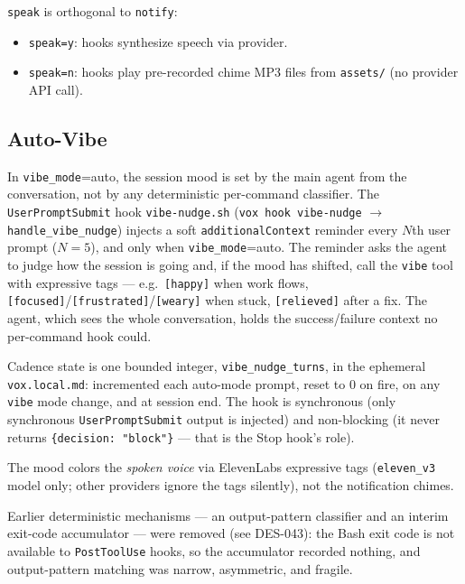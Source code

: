 \documentclass[a4paper,10pt]{article}
\newcommand{\tool}[1]{\texttt{#1}}
\newcommand{\field}[1]{\texttt{#1}}
\newcommand{\hook}[1]{\texttt{#1}}
\begin{document}
\field{speak} is orthogonal to \field{notify}:

\begin{itemize}
  \item \field{speak=y}: hooks synthesize speech via provider.
  \item \field{speak=n}: hooks play pre-recorded chime MP3 files
    from \texttt{assets/} (no provider API call).
\end{itemize}

\subsection{Auto-Vibe}

In \field{vibe\_mode}=auto, the session mood is set by the main
agent from the conversation, not by any deterministic per-command
classifier.  The \hook{UserPromptSubmit} hook \texttt{vibe-nudge.sh}
(\texttt{vox hook vibe-nudge} $\to$ \texttt{handle\_vibe\_nudge})
injects a soft \texttt{additionalContext} reminder every $N$th user
prompt ($N=5$), and only when \field{vibe\_mode}=auto.  The reminder
asks the agent to judge how the session is going and, if the mood has
shifted, call the \tool{vibe} tool with expressive tags --- e.g.\
\texttt{[happy]} when work flows,
\texttt{[focused]}/\texttt{[frustrated]}/\texttt{[weary]} when stuck,
\texttt{[relieved]} after a fix.  The agent, which sees the whole
conversation, holds the success/failure context no per-command hook
could.

Cadence state is one bounded integer, \field{vibe\_nudge\_turns}, in
the ephemeral \texttt{vox.local.md}: incremented each auto-mode prompt,
reset to $0$ on fire, on any \tool{vibe} mode change, and at session
end.  The hook is synchronous (only synchronous \hook{UserPromptSubmit}
output is injected) and non-blocking (it never returns
\texttt{\{decision: "block"\}} --- that is the Stop hook's role).

The mood colors the \emph{spoken voice} via ElevenLabs expressive tags
(\texttt{eleven\_v3} model only; other providers ignore the tags
silently), not the notification chimes.

Earlier deterministic mechanisms --- an output-pattern classifier and
an interim exit-code accumulator --- were removed (see DES-043): the
Bash exit code is not available to \hook{PostToolUse} hooks, so the
accumulator recorded nothing, and output-pattern matching was narrow,
asymmetric, and fragile.


\end{document}
